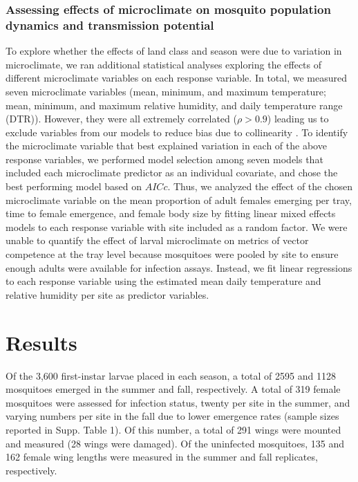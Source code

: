\documentclass[12pt]{article}
\begin{document}
\subsubsection{Assessing effects of microclimate on mosquito population dynamics and transmission potential}

To explore whether the effects of land class and season were due to variation in microclimate, we ran additional statistical analyses exploring the effects of different microclimate variables on each response variable. In total, we measured seven microclimate variables (mean, minimum, and maximum temperature; mean, minimum, and maximum relative humidity, and daily temperature range (DTR)). However, they were all extremely correlated ($\rho>0.9$) leading us to exclude variables from our models to reduce bias due to collinearity \citep{graham2003}. To identify the microclimate variable that best explained variation in each of the above response variables, we performed model selection among seven models that included each microclimate predictor as an individual covariate, and chose the best performing model based on $AICc$. Thus, we analyzed the effect of the chosen microclimate variable on the mean proportion of adult females emerging per tray, time to female emergence, and female body size by fitting linear mixed effects models to each response variable with site included as a random factor. We were unable to quantify the effect of larval microclimate on metrics of vector competence at the tray level because mosquitoes were pooled by site to ensure enough adults were available for infection assays. Instead, we fit linear regressions to each response variable using the estimated mean daily temperature and relative humidity per site as predictor variables. 

\section{Results}

Of the 3,600 first-instar larvae placed in each season, a total of 2595 and 1128 mosquitoes emerged in the summer and fall, respectively. A total of 319 female mosquitoes were assessed for infection status, twenty per site in the summer, and varying numbers per site in the fall due to lower emergence rates (sample sizes reported in Supp. Table 1). Of this number, a total of 291 wings were mounted and measured (28 wings were damaged). Of the uninfected mosquitoes, 135 and 162 female wing lengths were measured in the summer and fall replicates, respectively.
\end{document}
